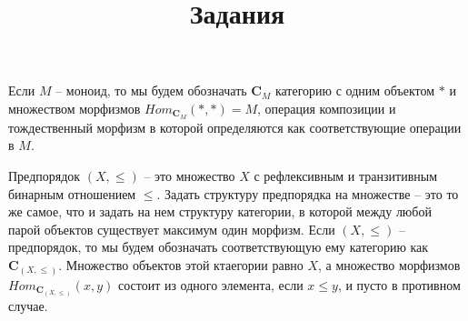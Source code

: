 \documentclass[draft]{article}
\newcommand{\cat}[1]{\mathbf{#1}}
\renewcommand{\C}{\cat{C}}
\begin{document}
\title{Задания}
\maketitle

Если $M$ -- моноид, то мы будем обозначать $\C_M$ категорию с одним объектом $*$ и множеством морфизмов $Hom_{\C_M}(*, *) = M$, операция композиции и тождественный морфизм в которой определяются как соответствующие операции в $M$.

Предпорядок $(X,\leq)$ -- это множество $X$ с рефлексивным и транзитивным бинарным отношением $\leq$.
Задать структуру предпорядка на множестве -- это то же самое, что и задать на нем структуру категории, в которой между любой парой объектов существует максимум один морфизм.
Если $(X,\leq)$ -- предпорядок, то мы будем обозначать соответствующую ему категорию как $\C_{(X,\leq)}$.
Множество объектов этой ктаегории равно $X$, а множество морфизмов $Hom_{\C_{(X,\leq)}}(x, y)$ состоит из одного элемента, если $x \leq y$, и пусто в противном случае.
\end{document}
